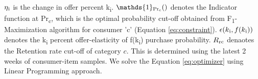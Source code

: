 $\eta\textsubscript{i}$ is the change in offer percent k\textsubscript{i}.
$ \mathds{1} \textsubscript{Pr\textsubscript{c}}()$ denotes the Indicator function 
at Pr\textsubscript{c}, which is the optimal probability cut-off obtained from F\textsubscript{1}-Maximization 
algorithm for consumer ’c’ (Equation \ref{eq:constraint}). $\epsilon(k\textsubscript{i},f(k\textsubscript{i}))$ 
denotes the k\textsubscript{i} percent offer-elasticity of f(k\textsubscript{i}) purchase probability.
$R\textsubscript{rc}$ denaotes the Retention rate cut-off of category $c$. This is determined using the latest
2 weeks of consumer-item samples. We solve the Equation \ref{eq:optimizer} using Linear Programming approach.

